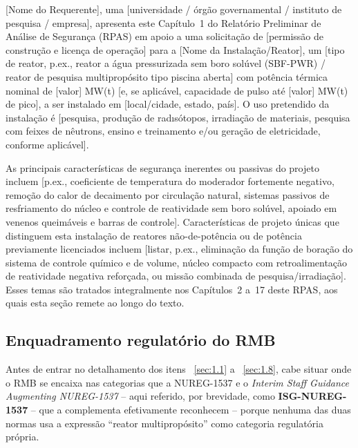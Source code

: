 [Nome do Requerente], uma [universidade / \'org\~ao governamental /
instituto de pesquisa / empresa], apresenta este Cap\'itulo~1 do
Relat\'orio Preliminar de An\'alise de Seguran\c{c}a (RPAS) em apoio a
uma solicita\c{c}\~ao de [permiss\~ao de constru\c{c}\~ao e licen\c{c}a de
opera\c{c}\~ao] para a [Nome da
Instala\c{c}\~ao/Reator], um [tipo de reator, p.ex., reator a \'agua
pressurizada sem boro sol\'uvel (SBF-PWR) / reator de pesquisa
multiprop\'osito tipo piscina aberta] com pot\^encia t\'ermica nominal de
[valor] MW(t) [e, se aplic\'avel, capacidade de pulso at\'e [valor]
MW(t) de pico], a ser instalado em [local/cidade, estado, pa\'is]. O uso
pretendido da instala\c{c}\~ao \'e [pesquisa, produ\c{c}\~ao de
rad\i s\'otopos, irradia\c{c}\~ao de materiais, pesquisa com feixes de
n\^eutrons, ensino e treinamento e/ou gera\c{c}\~ao de eletricidade,
conforme aplic\'avel].

As principais caracter\'isticas de seguran\c{c}a inerentes ou passivas do
projeto incluem [p.ex., coeficiente de temperatura do moderador
fortemente negativo, remo\c{c}\~ao do calor de decaimento por
circula\c{c}\~ao natural, sistemas passivos de resfriamento do n\'ucleo e
controle de reatividade sem boro sol\'uvel, apoiado em venenos
queim\'aveis e barras de controle]. Caracter\'isticas de projeto \'unicas
que distinguem esta instala\c{c}\~ao de reatores n\~ao-de-pot\^encia ou de
pot\^encia previamente licenciados incluem [listar, p.ex., elimina\c{c}\~ao
da fun\c{c}\~ao de bora\c{c}\~ao do sistema de controle qu\'imico e de
volume, n\'ucleo compacto com retroalimenta\c{c}\~ao de reatividade
negativa refor\c{c}ada, ou miss\~ao combinada de pesquisa/irradia\c{c}\~ao].
Esses temas s\~ao tratados integralmente nos Cap\'itulos~2 a~17 deste
RPAS, aos quais esta se\c{c}\~ao remete ao longo do texto.

\subsection*{Enquadramento regulat\'orio do RMB}
\label{sec:1.1.enquadramento}

Antes de entrar no detalhamento dos itens ~\ref{sec:1.1} a ~\ref{sec:1.8}, cabe situar onde o
RMB se encaixa nas categorias que a NUREG-1537 \citep{nureg1537p1,nureg1537p2} e o \emph{Interim Staff
Guidance Augmenting NUREG-1537}
\citep[NPR-ISG-2011-002;][]{isgnureg1537p1,isgnureg1537p2} -- aqui referido, por
brevidade, como \textbf{ISG-NUREG-1537} -- que a complementa efetivamente
reconhecem -- porque nenhuma das duas normas usa a express\~ao ``reator
multiprop\'osito'' como categoria regulat\'oria pr\'opria.


